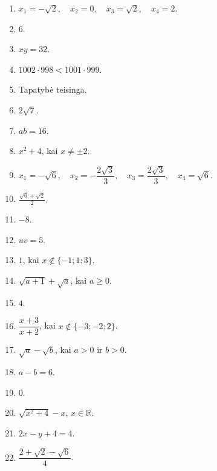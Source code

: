 \documentclass[11pt,a4paper]{article}
\begin{document}
\begin{enumerate}
\item \(x_1=-\sqrt2,\quad x_2=0,\quad x_3=\sqrt2,\quad x_4=2\).
\item \(6\).
\item \(xy=32\).
\item \(1002\cdot998<1001\cdot999\).
\item Tapatybė teisinga.
\item \(2\sqrt7\).
\item \(ab=16\).
\item \(x^2+4\), kai \(x\ne\pm2\).
\item \(x_1=-\sqrt6,\quad x_2=-\dfrac{2\sqrt3}{3},\quad x_3=\dfrac{2\sqrt3}{3},\quad x_4=\sqrt6\).
\item \(\frac{\sqrt6+\sqrt2}{2}\).
\item \(-8\).
\item \(uv=5\).
\item \(1\), kai \(x\notin\{-1;1;3\}\).
\item \(\sqrt{a+1}+\sqrt a\), kai \(a\ge0\).
\item \(4\).
\item \(\dfrac{x+3}{x+2}\), kai \(x\notin\{-3;-2;2\}\).
\item \(\sqrt a-\sqrt b\), kai \(a>0\) ir \(b>0\).
\item \(a-b=6\).
\item \(0\).
\item \(\sqrt{x^2+4}-x\), \(x\in\mathbb R\).
\item \(2x-y+4=4\).
\item \(\dfrac{2+\sqrt2-\sqrt6}{4}\).
\end{enumerate}
\end{document}
